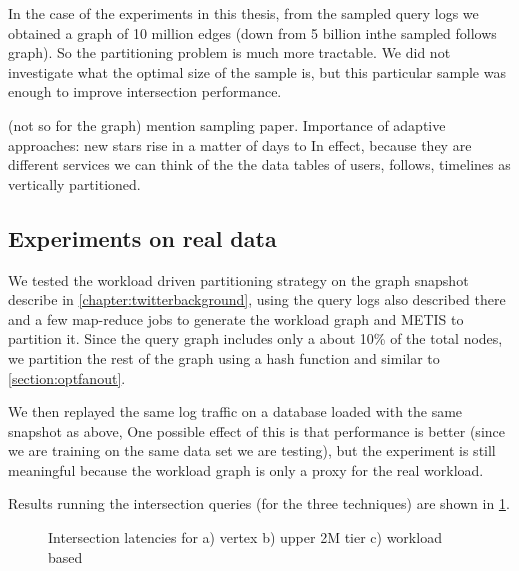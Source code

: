 In the case of the experiments in this thesis, from the sampled query logs we obtained a graph of 10 million edges (down from 5 billion inthe sampled follows graph). So the partitioning problem is much more tractable.  We did not investigate what the optimal size of the sample is, but this particular sample was enough to improve intersection performance.

(not so for the graph) mention sampling paper.
Importance of adaptive approaches: new stars rise in a matter of days to 
In effect, because they are different services we can think of the the data tables of users, follows, timelines as vertically partitioned.


\subsection{Experiments on real data}

We tested the workload driven partitioning strategy on the graph snapshot describe in \ref{chapter:twitterbackground}, using the query logs also described there and a few map-reduce jobs to generate the workload graph and METIS to partition it.  Since the query graph includes only a about 10\%  of the total nodes, we partition the rest of the graph using a hash function and similar to \ref{section:optfanout}.

We then replayed the same log traffic on a database loaded with the same snapshot as above,  One possible effect of this is that performance is better (since we are training on the same data set we are testing), but the experiment is still meaningful because the workload graph is only a proxy for the real workload. 

Results running the intersection queries (for the three techniques) are shown in \ref{fig:intersection}.

\begin{figure}
  \begin{center}
  \end{center}
  \label{fig:intersection}
  \caption{Intersection latencies for a) vertex b) upper 2M tier c) workload based}
\end{figure}


